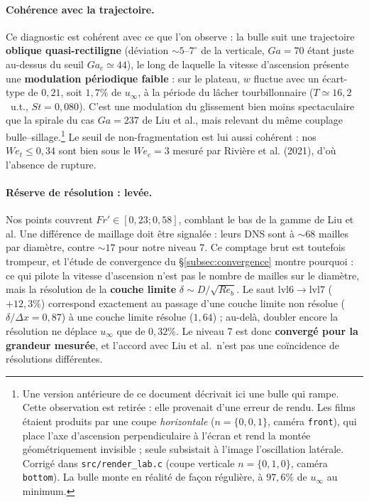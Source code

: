 \paragraph{Cohérence avec la trajectoire.} Ce diagnostic est cohérent avec ce que l'on
observe :
la bulle suit une trajectoire \textbf{oblique quasi-rectiligne} (déviation ${\sim}5$--$7^\circ$
de la verticale, $Ga=70$ étant juste au-dessus du seuil $Ga_c\simeq44$), le long de
laquelle la vitesse d'ascension présente une \textbf{modulation périodique faible} :
sur le plateau, $w$ fluctue avec un écart-type de $0{,}21$, soit $1{,}7\%$ de
$u_\infty$, à la période du lâcher tourbillonnaire ($T\simeq16{,}2$~u.t.,
$St=0{,}080$). C'est une modulation du glissement bien moins spectaculaire que la
spirale du cas $Ga=237$ de Liu et al., mais relevant du même couplage
bulle--sillage.\footnote{Une version antérieure de ce document décrivait ici une
bulle qui \og{}rampe\fg{}. Cette observation est retirée : elle provenait
d'une erreur de rendu. Les films étaient produits par une coupe \emph{horizontale}
($n=\{0,0,1\}$, caméra \texttt{front}), qui place l'axe d'ascension perpendiculaire à
l'écran et rend la montée géométriquement invisible ; seule subsistait à l'image
l'oscillation latérale. Corrigé dans \texttt{src/render\_lab.c} (coupe verticale
$n=\{0,1,0\}$, caméra \texttt{bottom}). La bulle monte en réalité de façon
régulière, à $97{,}6\%$ de $u_\infty$ au minimum.}
Le seuil de non-fragmentation est lui aussi cohérent : nos $We_t\le0{,}34$ sont bien
sous le $We_c=3$ mesuré par Rivière et al. (2021), d'où l'absence de rupture.

\paragraph{Réserve de résolution : levée.} Nos points couvrent
$Fr'\in[0{,}23;0{,}58]$, comblant le bas de la gamme de Liu et al. Une différence de
maillage doit être signalée : leurs DNS sont à ${\sim}68$ mailles par diamètre,
contre ${\sim}17$ pour notre niveau 7. Ce comptage brut est toutefois trompeur, et
l'étude de convergence du \S\ref{subsec:convergence} montre pourquoi : ce qui pilote
la vitesse d'ascension n'est pas le nombre de mailles sur le diamètre, mais la
résolution de la \textbf{couche limite} $\delta\sim D/\sqrt{Re_b}$. Le saut
lvl6$\to$lvl7 ($+12{,}3\%$) correspond exactement au passage d'une couche limite non
résolue ($\delta/\Delta x=0{,}87$) à une couche limite résolue ($1{,}64$) ; au-delà,
doubler encore la résolution ne déplace $u_\infty$ que de $0{,}32\%$. Le niveau 7 est
donc \textbf{convergé pour la grandeur mesurée}, et l'accord avec Liu et al.\ n'est
pas une coïncidence de résolutions différentes.

